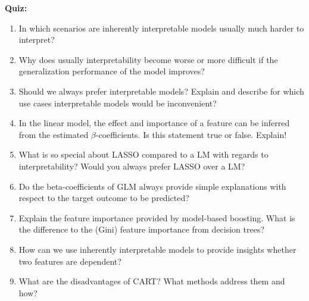 \textbf{Quiz:}
\begin{enumerate}
   	\item In which scenarios are inherently interpretable models usually much harder to interpret?
   	\item Why does usually interpretability become worse or more difficult if the generalization performance of the model improves?
   	\item Should we always prefer interpretable models? Explain and describe for which use cases interpretable models would be inconvenient?
  	\item In the linear model, the effect and importance of a feature can be inferred from the estimated $\beta$-coefficients. Is this statement true or false. Explain!
   	\item What is so special about LASSO compared to a LM with regards to interpretability? Would you always prefer LASSO over a LM?
   	\item Do the beta-coefficients of GLM always provide simple explanations with respect to the target outcome to be predicted? 
   	\item Explain the feature importance provided by model-based boosting. What is the difference to the (Gini) feature importance from decision trees?
   	\item How can we use inherently interpretable models to provide insights whether two features are dependent?
   	\item What are the disadvantages of CART? What methods address them and how?
\end{enumerate}